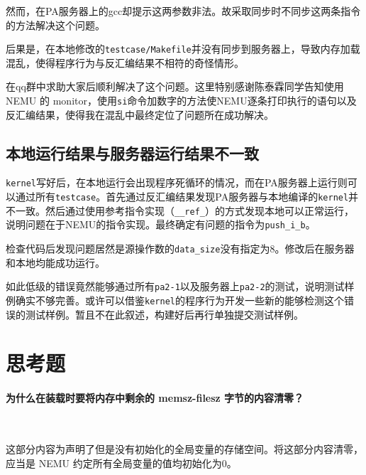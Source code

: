 \documentclass[UTF8]{ctexart}
\begin{document}
然而，在PA服务器上的gcc却提示这两参数非法。故采取同步时不同步这两条指令的方法解决这个问题。

后果是，在本地修改的\verb|testcase/Makefile|并没有同步到服务器上，导致内存加载混乱，使得程序行为与反汇编结果不相符的奇怪情形。

在qq群中求助大家后顺利解决了这个问题。这里特别感谢陈泰霖同学告知使用 NEMU 的 monitor，使用\verb|si|命令加数字的方法使NEMU逐条打印执行的语句以及反汇编结果，使得我在混乱中最终定位了问题所在成功解决。

\subsection{本地运行结果与服务器运行结果不一致}
\verb|kernel|写好后，在本地运行会出现程序死循环的情况，而在PA服务器上运行则可以通过所有\verb|testcase|。首先通过反汇编结果发现PA服务器与本地编译的\verb|kernel|并不一致。然后通过使用参考指令实现（\verb|__ref_|）的方式发现本地可以正常运行，说明问题在于NEMU的指令实现。最终确定有问题的指令为\verb|push_i_b|。

检查代码后发现问题居然是源操作数的\verb|data_size|没有指定为8。修改后在服务器和本地均能成功运行。

如此低级的错误竟然能够通过所有\verb|pa2-1|以及服务器上\verb|pa2-2|的测试，说明测试样例确实不够完善。或许可以借鉴\verb|kernel|的程序行为开发一些新的能够检测这个错误的测试样例。暂且不在此叙述，构建好后再行单独提交测试样例。

\section{思考题}
\paragraph{为什么在装载时要将内存中剩余的 memsz-filesz 字节的内容清零？}~
\par 这部分内容为声明了但是没有初始化的全局变量的存储空间。将这部分内容清零，应当是 NEMU 约定所有全局变量的值均初始化为0。
\end{document}
